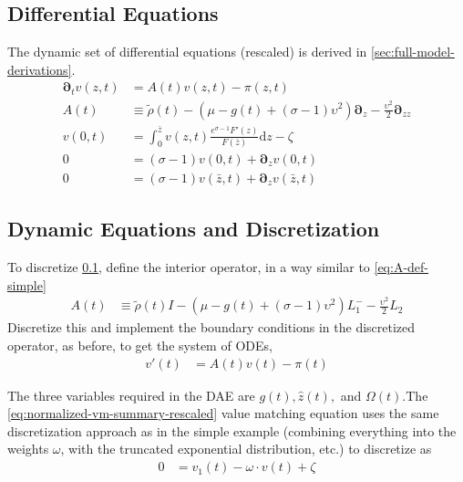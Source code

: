 \documentclass[11pt]{article}
\newcommand{\D}[1][]{\ensuremath{\boldsymbol{\partial}_{#1}}}
\newcommand{\diff}{\ensuremath{\mathrm{d}}}
\begin{document}
\subsection{Differential Equations}\label{sec:full-ODE}
The dynamic set of differential equations (rescaled) is derived in \cref{sec:full-model-derivations}.
\begin{align}
	\D[t]v(z,t) &= A(t)v(z,t) - \pi(z,t) \\
	A(t) &\equiv \tilde{\rho}(t)  - (\mu - g(t) + (\sigma - 1)\upsilon^2)\D[z] - \frac{\upsilon^2}{2}\D[zz]\\
	v(0,t) &= \int_{0}^{\bar{z}}v(z,t) \frac{e^{\sigma - 1}F'(z)}{F(\bar{z})} \diff z - \zeta\\
	0 &= (\sigma - 1)v(0,t) + \D[z]v(0,t)\\
	0 &= (\sigma - 1)v(\bar{z},t) + \D[z]v(\bar{z},t)
\end{align}




\subsection{Dynamic Equations and Discretization}
To discretize \cref{sec:full-ODE}, define the interior operator, in a way similar to \cref{eq:A-def-simple}
\begin{align}
	A(t) &\equiv \tilde{\rho}(t) I - (\mu - g(t) + (\sigma - 1)\upsilon^2) L^{-}_1 - \frac{\upsilon^2}{2} L_2\label{eq:A-def-full}
	\end{align}
Discretize this and implement the boundary conditions in the discretized operator, as before, to get the system of ODEs,
\begin{align}
	v'(t) &= A(t) v(t) - \pi(t)
\end{align}

The three variables required in the DAE are $g(t), \hat{z}(t),$ and $\Omega(t)$.The \cref{eq:normalized-vm-summary-rescaled} value matching equation uses the same discretization approach as in the simple example (combining everything into the weights $\omega$, with the truncated exponential distribution, etc.) to discretize as
\begin{align}
	0 &= v_1(t) - \omega \cdot v(t) + \zeta
\end{align}
\end{document}

